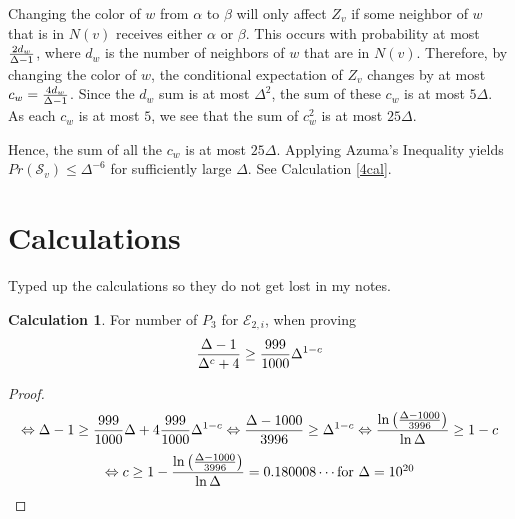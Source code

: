 \documentclass[12pt]{article}
\newtheorem{claim}[theorem]{Claim}
\theoremstyle{definition}
\newtheorem{calculation}[theorem]{Calculation}
\newcommand{\lra}{\Leftrightarrow}
\begin{document}
Changing the color of $w$ from $\alpha$ to $\beta$ will only affect $Z_v$ if some neighbor of $w$ that is in $N(v)$ receives either $\alpha$ or $\beta$. 
This occurs with probability at most ${2d_w\over \Delta-1}$, where $d_w$ is the number of neighbors of $w$ that are in $N(v)$.
Therefore, by changing the color of $w$, the conditional expectation of $Z_v$ changes by at most $c_w={4d_w\over \Delta-1}$. 
Since the $d_w$ sum is at most $\Delta^2$, the sum of these $c_w$ is at most $5\Delta$. As each $c_w$ is at most $5$, we see that the sum of $c_w^2$ is at most $25\Delta$.

Hence, the sum of all the $c_w$ is at most $25\Delta$. Applying Azuma's Inequality yields $Pr(\mathcal{S}_{v})\leq \Delta^{-6}$ for sufficiently large $\Delta$. See Calculation \ref{4cal}.


\section{Calculations}

Typed up the calculations so they do not get lost in my notes. 

\begin{calculation}\label{2p3}
For number of $P_3$ for $\mathcal{E}_{2, i}$, when proving
$${\Delta-1\over \Delta^c+4}\geq {999\over 1000}\Delta^{1-c}$$
\end{calculation}
\begin{proof}
$$\lra \Delta-1\geq {999\over 1000}\Delta +4{999\over 1000}\Delta^{1-c}
\lra {\Delta-1000\over 3996}\geq \Delta^{1-c}
\lra {\ln\left( {\Delta-1000\over 3996}\right)\over \ln\Delta} \geq 1-c$$
$$\lra c \geq1- {\ln\left( {\Delta-1000\over 3996}\right)\over \ln\Delta}
=0.180008\cdots \mbox{for $\Delta=10^{20}$}$$

\end{proof}
\end{document}
